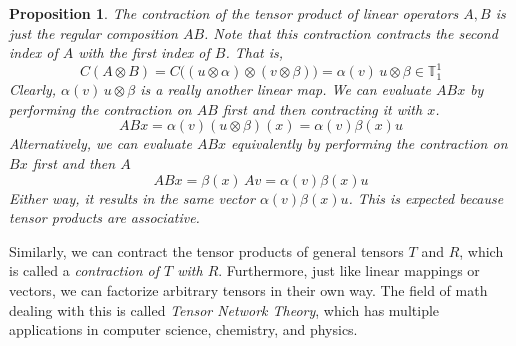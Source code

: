 \documentclass{article}
\newtheorem{proposition}[theorem]{Proposition}
\theoremstyle{remark}
\theoremstyle{definition}
\begin{document}
\begin{proposition}
The contraction of the tensor product of linear operators $A, B$ is just the regular composition $A B$. Note that this contraction contracts the second index of $A$ with the first index of $B$. That is, 
\[C(A \otimes B) = C\big( (u \otimes \alpha) \otimes (v \otimes \beta) \big) = \alpha(v) \, u \otimes \beta \in \mathbb{T}^1_1\]
Clearly, $\alpha(v) \, u \otimes \beta$ is a really another linear map. We can evaluate $A B x$ by performing the contraction on $A B$ first and then contracting it with $x$. 
\[A B x = \alpha (v) (u \otimes \beta) (x) = \alpha (v) \beta(x) u \]
Alternatively, we can evaluate $A B x$ equivalently by performing the contraction on $B x$ first and then $A$ 
\[A B x = \beta (x)\, A v = \alpha(v) \beta(x) u\]
Either way, it results in the same vector $\alpha (v) \beta (x) u$. This is expected because tensor products are associative. 
\end{proposition}

Similarly, we can contract the tensor products of general tensors $T$ and $R$, which is called a \textit{contraction of $T$ with $R$}. Furthermore, just like linear mappings or vectors, we can factorize arbitrary tensors in their own way. The field of math dealing with this is called \textit{Tensor Network Theory}, which has multiple applications in computer science, chemistry, and physics. 
\end{document}
